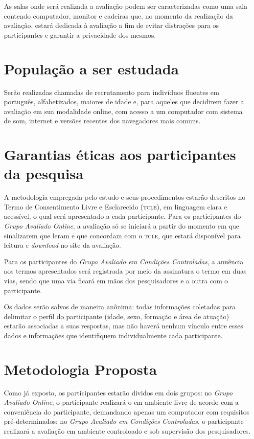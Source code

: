 \documentclass[a4paper,11pt,titlepage,singlespacing]{article}
\begin{document}
\noindent As salas onde será realizada a avaliação podem ser caracterizadas como uma sala contendo computador, monitor e cadeiras que, no momento da realização da avaliação, estará dedicada à avaliação a fim de evitar distrações para os participantes e garantir a privacidade dos mesmos.

\section{População a ser estudada}

\noindent Serão realizadas chamadas de recrutamento para indivíduos fluentes em português, alfabetizados, maiores de idade e, para aqueles que decidirem fazer a avaliação em sua modalidade online, com acesso a um computador com sistema de som, internet e versões recentes dos navegadores mais comuns.

\section{Garantias éticas aos participantes da pesquisa}
\noindent A metodologia empregada pelo estudo e seus procedimentos estarão descritos no Termo de Consentimento Livre e Esclarecido (\textsc{tcle}), em linguagem clara e acessível, o qual será apresentado a cada participante. Para os participantes do \textit{Grupo Avaliado Online}, a avaliação só se iniciará a partir do momento em que sinalizarem que leram e que concordam com o \textsc{tcle}, que estará disponível para leitura e \textit{download} no site da avaliação. 

Para os participantes do \textit{Grupo Avaliado em Condições Controladas}, a anuência aos termos apresentados será registrada por meio da assinatura o termo em duas vias, sendo que uma via ficará em mãos dos pesquisadores e a outra com o participante.

Os dados serão salvos de maneira anônima: todas informações coletadas para delimitar o perfil do participante (idade, sexo, formação e área de atuação) estarão associadas a suas respostas, mas não haverá nenhum vínculo entre esses dados e informações que identifiquem individualmente cada participante.



\section{Metodologia Proposta}

\noindent Como já exposto, os participantes estarão dividos em dois grupos: no \textit{Grupo Avaliado Online}, o participante realizará o em ambiente livre de acordo com a conveniência do participante, demandando apenas um computador com requisitos pré-determinados; no \textit{Grupo Avaliado em Condições Controladas}, o participante realizará a avaliação em ambiente controloado e sob supervisão dos pesquisadores.
\end{document}
